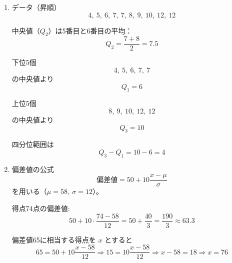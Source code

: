 \documentclass[lualatex,ja=standard]{bxjsarticle}
\begin{document}
\begin{enumerate}
\item データ（昇順）
\[
4,\ 5,\ 6,\ 7,\ 7,\ 8,\ 9,\ 10,\ 12,\ 12
\]

中央値（$Q_2$）は5番目と6番目の平均：
\[
Q_2=\frac{7+8}{2}=7.5
\]

下位5個
\[
4,\ 5,\ 6,\ 7,\ 7
\]
の中央値より
\[
Q_1=6
\]

上位5個
\[
8,\ 9,\ 10,\ 12,\ 12
\]
の中央値より
\[
Q_3=10
\]

四分位範囲は
\[
Q_3-Q_1=10-6=4
\]

\item 偏差値の公式
\[
\text{偏差値}=50+10\frac{x-\mu}{\sigma}
\]
を用いる（$\mu=58,\ \sigma=12$）。

得点74点の偏差値:
\[
50+10\cdot\frac{74-58}{12}
=50+\frac{40}{3}
=\frac{190}{3}\approx63.3
\]

偏差値65に相当する得点を $x$ とすると
\[
65=50+10\frac{x-58}{12}
\Rightarrow 15=10\frac{x-58}{12}
\Rightarrow x-58=18
\Rightarrow x=76
\]
\end{enumerate}
\end{document}
